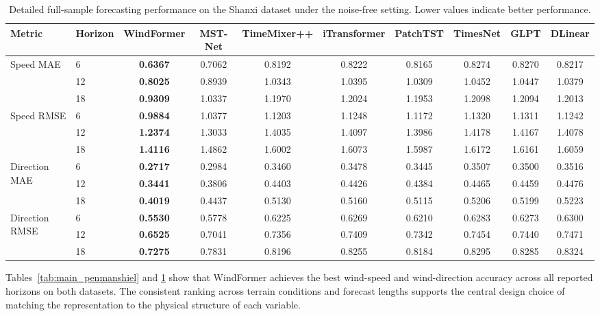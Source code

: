 \begin{table}[htbp]
\caption{Detailed full-sample forecasting performance on the Shanxi dataset under the noise-free setting. Lower values indicate better performance.}
\label{tab:main_shanxi}
\centering
\scriptsize
\setlength{\tabcolsep}{5pt}
\renewcommand{\arraystretch}{1.04}
\begin{adjustbox}{max width=\textwidth}
\begin{tabular}{llcccccccc}
\toprule
Metric & Horizon & WindFormer & MST-Net & TimeMixer++ & iTransformer & PatchTST & TimesNet & GLPT & DLinear \\
\midrule
\multirow{3}{*}{Speed MAE} & 6 & \textbf{0.6367} & 0.7062 & 0.8192 & 0.8222 & 0.8165 & 0.8274 & 0.8270 & 0.8217 \\
& 12 & \textbf{0.8025} & 0.8939 & 1.0343 & 1.0395 & 1.0309 & 1.0452 & 1.0447 & 1.0379 \\
& 18 & \textbf{0.9309} & 1.0337 & 1.1970 & 1.2024 & 1.1953 & 1.2098 & 1.2094 & 1.2013 \\
\midrule
\multirow{3}{*}{Speed RMSE} & 6 & \textbf{0.9884} & 1.0377 & 1.1203 & 1.1248 & 1.1172 & 1.1320 & 1.1311 & 1.1242 \\
& 12 & \textbf{1.2374} & 1.3033 & 1.4035 & 1.4097 & 1.3986 & 1.4178 & 1.4167 & 1.4078 \\
& 18 & \textbf{1.4116} & 1.4862 & 1.6002 & 1.6073 & 1.5987 & 1.6172 & 1.6161 & 1.6059 \\
\midrule
\multirow{3}{*}{Direction MAE} & 6 & \textbf{0.2717} & 0.2984 & 0.3460 & 0.3478 & 0.3445 & 0.3507 & 0.3500 & 0.3516 \\
& 12 & \textbf{0.3441} & 0.3806 & 0.4403 & 0.4426 & 0.4384 & 0.4465 & 0.4459 & 0.4476 \\
& 18 & \textbf{0.4019} & 0.4437 & 0.5130 & 0.5160 & 0.5115 & 0.5206 & 0.5199 & 0.5223 \\
\midrule
\multirow{3}{*}{Direction RMSE} & 6 & \textbf{0.5530} & 0.5778 & 0.6225 & 0.6269 & 0.6210 & 0.6283 & 0.6273 & 0.6300 \\
& 12 & \textbf{0.6525} & 0.7041 & 0.7356 & 0.7409 & 0.7342 & 0.7454 & 0.7440 & 0.7471 \\
& 18 & \textbf{0.7275} & 0.7831 & 0.8196 & 0.8255 & 0.8184 & 0.8295 & 0.8285 & 0.8324 \\
\bottomrule
\end{tabular}
\end{adjustbox}
\end{table}

Tables~\ref{tab:main_penmanshiel} and \ref{tab:main_shanxi} show that WindFormer achieves the best wind-speed and wind-direction accuracy across all reported horizons on both datasets. The consistent ranking across terrain conditions and forecast lengths supports the central design choice of matching the representation to the physical structure of each variable.

